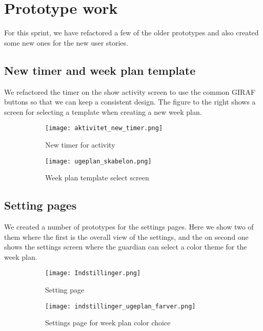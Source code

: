 \section{Prototype work}
For this sprint, we have refactored a few of the older prototypes and also created some new ones for the new user stories.

\subsection{New timer and week plan template}
We refactored the timer on the show activity screen to use the common GIRAF buttons so that we can keep a consistent design. The figure to the right shows a screen for selecting a template when creating a new week plan.
\begin{figure}[H]
    \begin{subfigure}{0.5\textwidth}
    \texttt{[image: aktivitet\_new\_timer.png]}
    \caption{New timer for activity}
    \label{fig:activity_new_timer}
    \end{subfigure}
    \begin{subfigure}{0.5\textwidth}
        \texttt{[image: ugeplan\_skabelon.png]}
    \caption{Week plan template select screen}
    \label{fig:weekplan_template_screen}
    \end{subfigure} 
    \caption{}
    \label{activity_new_timer_and_weekplan_template_screen}
\end{figure}

\subsection{Setting pages}
We created a number of prototypes for the settings pages. Here we show two of them where the first is the overall view of the settings, and the on second one shows the settings screen where the guardian can select a color theme for the week plan.
\begin{figure}[H]
    \begin{subfigure}{0.5\textwidth}
    \texttt{[image: Indstillinger.png]} 
    \caption{Setting page}
    \label{fig:settings}
    \end{subfigure}
    \begin{subfigure}{0.5\textwidth}
        \texttt{[image: indstillinger\_ugeplan\_farver.png]}
    \caption{Settings page for week plan color choice}
    \label{fig:settings_color_choice}
    \end{subfigure}
    \caption{} 
    \label{settings_and_settings_color_choice}
\end{figure}

